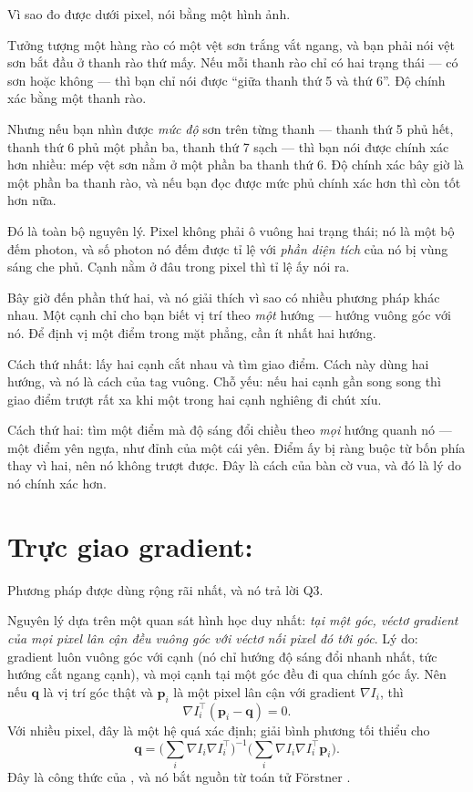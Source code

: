 \documentclass[../../marker.tex]{subfiles}
\begin{document}
\begin{trucgiac}
Vì sao đo được dưới pixel, nói bằng một hình ảnh.

Tưởng tượng một hàng rào có một vệt sơn trắng vắt ngang, và bạn phải nói vệt sơn bắt đầu ở thanh rào thứ mấy. Nếu mỗi thanh rào chỉ có hai trạng thái --- có sơn hoặc không --- thì bạn chỉ nói được ``giữa thanh thứ 5 và thứ 6''. Độ chính xác bằng một thanh rào.

Nhưng nếu bạn nhìn được \emph{mức độ} sơn trên từng thanh --- thanh thứ 5 phủ hết, thanh thứ 6 phủ một phần ba, thanh thứ 7 sạch --- thì bạn nói được chính xác hơn nhiều: mép vệt sơn nằm ở một phần ba thanh thứ 6. Độ chính xác bây giờ là một phần ba thanh rào, và nếu bạn đọc được mức phủ chính xác hơn thì còn tốt hơn nữa.

Đó là toàn bộ nguyên lý. Pixel không phải ô vuông hai trạng thái; nó là một bộ đếm photon, và số photon nó đếm được tỉ lệ với \emph{phần diện tích} của nó bị vùng sáng che phủ. Cạnh nằm ở đâu trong pixel thì tỉ lệ ấy nói ra.

Bây giờ đến phần thứ hai, và nó giải thích vì sao có nhiều phương pháp khác nhau. Một cạnh chỉ cho bạn biết vị trí theo \emph{một} hướng --- hướng vuông góc với nó. Để định vị một điểm trong mặt phẳng, cần ít nhất hai hướng.

Cách thứ nhất: lấy hai cạnh cắt nhau và tìm giao điểm. Cách này dùng hai hướng, và nó là cách của tag vuông. Chỗ yếu: nếu hai cạnh gần song song thì giao điểm trượt rất xa khi một trong hai cạnh nghiêng đi chút xíu.

Cách thứ hai: tìm một điểm mà độ sáng đổi chiều theo \emph{mọi} hướng quanh nó --- một điểm yên ngựa, như đỉnh của một cái yên. Điểm ấy bị ràng buộc từ bốn phía thay vì hai, nên nó không trượt được. Đây là cách của bàn cờ vua, và đó là lý do nó chính xác hơn.
\end{trucgiac}

\section{Trực giao gradient: \texorpdfstring{}{cornerSubPix}}

Phương pháp được dùng rộng rãi nhất, và nó trả lời Q3.

Nguyên lý dựa trên một quan sát hình học duy nhất: \emph{tại một góc, véctơ gradient của mọi pixel lân cận đều vuông góc với véctơ nối pixel đó tới góc}. Lý do: gradient luôn vuông góc với cạnh (nó chỉ hướng độ sáng đổi nhanh nhất, tức hướng cắt ngang cạnh), và mọi cạnh tại một góc đều đi qua chính góc ấy. Nên nếu \(\mathbf{q}\) là vị trí góc thật và \(\mathbf{p}_i\) là một pixel lân cận với gradient \(\nabla I_i\), thì
\[
\nabla I_i^\top (\mathbf{p}_i - \mathbf{q}) = 0 .
\]
Với nhiều pixel, đây là một hệ quá xác định; giải bình phương tối thiểu cho
\begin{equation}
\mathbf{q} = \Big(\sum_i \nabla I_i \nabla I_i^\top\Big)^{-1} \Big(\sum_i \nabla I_i \nabla I_i^\top \mathbf{p}_i\Big).
\label{eq:b08-subpix}
\end{equation}
Đây là công thức của , và nó bắt nguồn từ toán tử Förstner \cite{forstner1987fast}.
\end{document}
